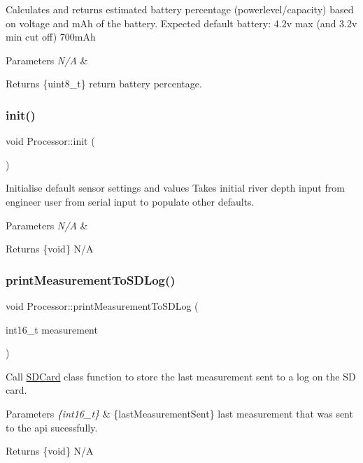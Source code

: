 Calculates and returns estimated battery percentage (powerlevel/capacity) based on voltage and m\+Ah of the battery. Expected default battery\+: 4.\+2v max (and 3.\+2v min cut off) 700m\+Ah 
\begin{DoxyParams}{Parameters}
{\em N/A} & \\
\hline
\end{DoxyParams}
\begin{DoxyReturn}{Returns}
\{uint8\+\_\+t\} return battery percentage. 
\end{DoxyReturn}
\mbox{\label{class_processor_a22e869ee49d974ad0ee7ee81961ab88f}} 
\subsubsection{\texorpdfstring{init()}{init()}}
{\footnotesize\ttfamily void Processor\+::init (\begin{DoxyParamCaption}{ }\end{DoxyParamCaption})}

Initialise default sensor settings and values Takes initial river depth input from engineer user from serial input to populate other defaults. 
\begin{DoxyParams}{Parameters}
{\em N/A} & \\
\hline
\end{DoxyParams}
\begin{DoxyReturn}{Returns}
\{void\} N/A 
\end{DoxyReturn}
\mbox{\label{class_processor_aa60b755d3022b3b0f83f654e2b7e2e1d}} 
\subsubsection{\texorpdfstring{print\+Measurement\+To\+S\+D\+Log()}{printMeasurementToSDLog()}}
{\footnotesize\ttfamily void Processor\+::print\+Measurement\+To\+S\+D\+Log (\begin{DoxyParamCaption}\item[{int16\+\_\+t}]{measurement }\end{DoxyParamCaption})}

Call \mbox{\hyperlink{class_s_d_card}{S\+D\+Card}} class function to store the last measurement sent to a log on the SD card. 
\begin{DoxyParams}{Parameters}
{\em \{int16\+\_\+t\}} & \{last\+Measurement\+Sent\} last measurement that was sent to the api sucessfully. \\
\hline
\end{DoxyParams}
\begin{DoxyReturn}{Returns}
\{void\} N/A 
\end{DoxyReturn}
\mbox{\label{class_processor_a694b889c3c6f8c09b998b4012d304d6e}} 
